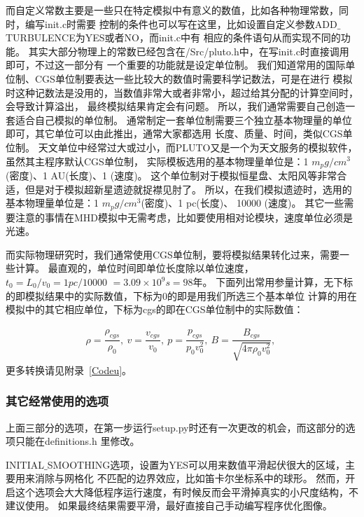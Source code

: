 而自定义常数主要是一些只在特定模拟中有意义的数值，比如各种物理常数，同时，编写init.c时需要
控制的条件也可以写在这里，比如设置自定义参数ADD$\_$TURBULENCE为YES或者NO，而init.c中有
相应的条件语句从而实现不同的功能。
其实大部分物理上的常数已经包含在/Src/pluto.h中，在写init.c时直接调用即可，不过这一部分有
一个重要的功能就是设定单位制。
我们知道常用的国际单位制、CGS单位制要表达一些比较大的数值时需要科学记数法，可是在进行
模拟时这种记数法是没用的，当数值非常大或者非常小，超过给其分配的计算空间时，会导致计算溢出，
最终模拟结果肯定会有问题。
所以，我们通常需要自己创造一套适合自己模拟的单位制。
通常制定一套单位制需要三个独立基本物理量的单位即可，其它单位可以由此推出，通常大家都选用
长度、质量、时间，类似CGS单位制。
天文单位中经常过大或过小，而PLUTO又是一个为天文服务的模拟软件，虽然其主程序默认CGS单位制，
实际模板选用的基本物理量单位是：1 $m_p g/cm^3$(密度)、1 AU(长度)、1 \kms(速度)。
这个单位制对于模拟恒星盘、太阳风等非常合适，但是对于模拟超新星遗迹就捉襟见肘了。
所以，在我们模拟遗迹时，选用的基本物理量单位是：1 $m_p g/cm^3$(密度)、1 pc(长度)、
10000 \kms(速度)。
其它一些需要注意的事情在MHD模拟中无需考虑，比如要使用相对论模块，速度单位必须是光速。

而实际物理研究时，我们通常使用CGS单位制，要将模拟结果转化过来，需要一些计算。
最直观的，单位时间即单位长度除以单位速度，
$t_0 = L_0/v_0 = 1 pc/10000$ \kms $= 3.09\times10^9 s = 98$年。
下面列出常用参量计算，无下标的即模拟结果中的实际数值，下标为0的即是用我们所选三个基本单位
计算的用在模拟中的其它相应单位，下标为cgs的即在CGS单位制中的实际数值：

\begin{equation}
  \begin{aligned}
    \rho = \dfrac{\rho_{cgs}}{\rho_0} ,   \
    v = \dfrac{v_{cgs}}{v_0} ,   \
    p= \dfrac{p_{cgs}}{p_0v_0^2} ,   \
    B = \dfrac{B_{cgs}}{\sqrt{4\pi\rho_0v_0^2}} ,   \
  \end{aligned}
\end{equation}
更多转换请见附录~\ref{Codeu}。

\subsubsection{其它经常使用的选项}
上面三部分的选项，在第一步运行setup.py时还有一次更改的机会，而这部分的选项只能在definitions.h
里修改。

INITIAL$\_$SMOOTHING选项，设置为YES可以用来数值平滑起伏很大的区域，主要用来消除与网格化
不匹配的边界效应，比如笛卡尔坐标系中的球形。
然而，开启这个选项会大大降低程序运行速度，有时候反而会平滑掉真实的小尺度结构，不建议使用。
如果最终结果需要平滑，最好直接自己手动编写程序优化图像。

